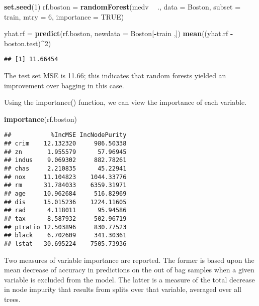 \documentclass[]{article}
\newenvironment{Shaded}{\begin{snugshade}}{\end{snugshade}}
\newcommand{\KeywordTok}[1]{\textcolor[rgb]{0.13,0.29,0.53}{\textbf{#1}}}
\newcommand{\DataTypeTok}[1]{\textcolor[rgb]{0.13,0.29,0.53}{#1}}
\newcommand{\DecValTok}[1]{\textcolor[rgb]{0.00,0.00,0.81}{#1}}
\newcommand{\StringTok}[1]{\textcolor[rgb]{0.31,0.60,0.02}{#1}}
\newcommand{\OtherTok}[1]{\textcolor[rgb]{0.56,0.35,0.01}{#1}}
\newcommand{\OperatorTok}[1]{\textcolor[rgb]{0.81,0.36,0.00}{\textbf{#1}}}
\newcommand{\NormalTok}[1]{#1}
\begin{document}
\begin{Shaded}
\begin{Highlighting}[]
\KeywordTok{set.seed}\NormalTok{(}\DecValTok{1}\NormalTok{)}
\NormalTok{rf.boston =}\StringTok{ }\KeywordTok{randomForest}\NormalTok{(medv }\OperatorTok{~}\StringTok{ }\NormalTok{., }\DataTypeTok{data =}\NormalTok{ Boston, }\DataTypeTok{subset =}\NormalTok{ train,}
                       \DataTypeTok{mtry =} \DecValTok{6}\NormalTok{,}
                       \DataTypeTok{importance =} \OtherTok{TRUE}\NormalTok{)}

\NormalTok{yhat.rf =}\StringTok{ }\KeywordTok{predict}\NormalTok{(rf.boston, }\DataTypeTok{newdata =}\NormalTok{ Boston[}\OperatorTok{-}\NormalTok{train ,])}
\KeywordTok{mean}\NormalTok{((yhat.rf }\OperatorTok{-}\StringTok{ }\NormalTok{boston.test)}\OperatorTok{^}\DecValTok{2}\NormalTok{)}
\end{Highlighting}
\end{Shaded}

\begin{verbatim}
## [1] 11.66454
\end{verbatim}

The test set MSE is 11.66; this indicates that random forests yielded an
improvement over bagging in this case.

Using the importance() function, we can view the importance of each
variable.

\begin{Shaded}
\begin{Highlighting}[]
\KeywordTok{importance}\NormalTok{(rf.boston)}
\end{Highlighting}
\end{Shaded}

\begin{verbatim}
##           %IncMSE IncNodePurity
## crim    12.132320     986.50338
## zn       1.955579      57.96945
## indus    9.069302     882.78261
## chas     2.210835      45.22941
## nox     11.104823    1044.33776
## rm      31.784033    6359.31971
## age     10.962684     516.82969
## dis     15.015236    1224.11605
## rad      4.118011      95.94586
## tax      8.587932     502.96719
## ptratio 12.503896     830.77523
## black    6.702609     341.30361
## lstat   30.695224    7505.73936
\end{verbatim}

Two measures of variable importance are reported. The former is based
upon the mean decrease of accuracy in predictions on the out of bag
samples when a given variable is excluded from the model. The latter is
a measure of the total decrease in node impurity that results from
splits over that variable, averaged over all trees.
\end{document}
